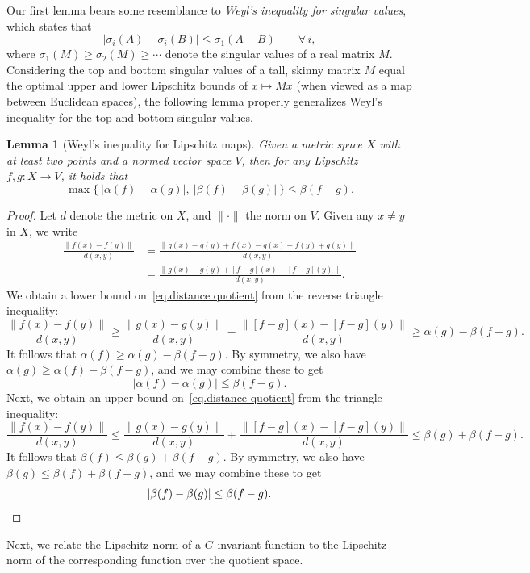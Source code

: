 \documentclass{article}
\theoremstyle{plain}
\newtheorem{lemma}[theorem]{Lemma}
\theoremstyle{definition}
\begin{document}
Our first lemma bears some resemblance to \textit{Weyl's inequality for singular values}, which states that
\[
|\sigma_i(A)-\sigma_i(B)|
\leq\sigma_1(A-B)
\qquad
\forall\,i,
\]
where $\sigma_1(M)\geq\sigma_2(M)\geq\cdots$ denote the singular values of a real matrix $M$.
Considering the top and bottom singular values of a tall, skinny matrix $M$ equal the optimal upper and lower Lipschitz bounds of $x\mapsto Mx$ (when viewed as a map between Euclidean spaces), the following lemma properly generalizes Weyl's inequality for the top and bottom singular values.

\begin{lemma}[Weyl's inequality for Lipschitz maps]
\label{lem.weyl}
Given a metric space $X$ with at least two points and a normed vector space $V$, then for any Lipschitz $f, g \colon X \to V$, it holds that
\[
\max\Big\{~
| \alpha(f) - \alpha(g) | ,~
| \beta(f) - \beta(g) | ~\Big\}
\leq \beta(f-g).
\]
\end{lemma}

\begin{proof}
Let $d$ denote the metric on $X$, and $\|\cdot\|$ the norm on $V$.
Given any $x \neq y$ in $X$, we write
\begin{align}
\frac{ \| f(x) - f(y) \|}{d(x,y)}
\nonumber
&= \frac{ \| g(x) - g(y) + f(x) - g(x) - f(y) + g(y) \| }{d(x,y)} \\[5 pt]
\label{eq.distance quotient}
&= \frac{ \| g(x) - g(y) + [f-g](x) - [f-g](y) \| }{d(x,y)}.
\end{align}
We obtain a lower bound on~\eqref{eq.distance quotient} from the reverse triangle inequality:
\[
\frac{ \| f(x) - f(y) \|}{d(x,y)}
\geq \frac{ \| g(x) - g(y) \|}{d(x,y)} - \frac{ \| [f-g](x) - [f-g](y) \| }{d(x,y)}
\geq \alpha(g) - \beta(f-g).
\]
It follows that $\alpha(f) \geq \alpha(g) - \beta(f-g)$.
By symmetry, we also have $\alpha(g) \geq \alpha(f) - \beta(f-g)$, and we may combine these to get
\[
|\alpha(f) - \alpha(g)| \leq \beta(f-g).
\]
Next, we obtain an upper bound on~\eqref{eq.distance quotient} from the triangle inequality:
\[
\frac{ \| f(x) - f(y) \|}{d(x,y)}
\leq \frac{ \| g(x) - g(y) \|}{d(x,y)} + \frac{ \| [f-g](x) - [f-g](y) \| }{d(x,y)}
\leq \beta(g) + \beta(f-g).
\]
It follows that $\beta(f) \leq \beta(g) + \beta(f-g)$.
By symmetry, we also have $\beta(g) \leq \beta(f) + \beta(f-g)$, and we may combine these to get
\[
|\beta(f) - \beta(g)| \leq \beta(f-g).
\qedhere
\]
\end{proof}

Next, we relate the Lipschitz norm of a $G$-invariant function to the Lipschitz norm of the corresponding function over the quotient space.
\end{document}
